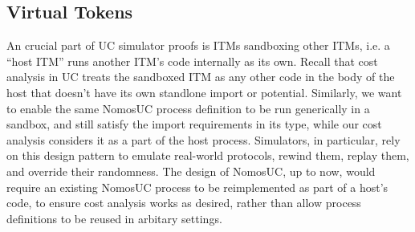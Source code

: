 %
%
%
%
%

\subsection{Virtual Tokens}
An crucial part of UC simulator proofs is ITMs sandboxing other ITMs, i.e. a
``host ITM'' runs another ITM's code internally as its own.  Recall that cost
analysis in UC treats the sandboxed ITM as any other code in the body of the
host that doesn't have its own standlone import or potential.  Similarly, we
want to enable the same NomosUC process definition to be run generically in a
sandbox, and still satisfy the import requirements in its type, while our cost
analysis considers it as a part of the host process.  Simulators, in
particular, rely on this design pattern to emulate real-world protocols, rewind
them, replay them, and override their randomness.  The design of NomosUC, up to
now, would require an existing NomosUC process to be reimplemented as part of a
host's code, to ensure cost analysis works as desired, rather than allow
process definitions to be reused in arbitary settings.

